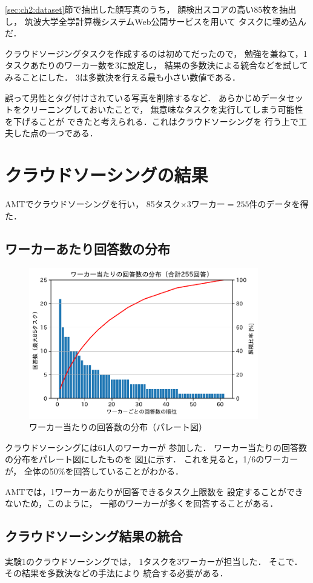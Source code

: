 \ref{sec:ch2:dataset}節で抽出した顔写真のうち，
顔検出スコアの高い85枚を抽出し，
筑波大学全学計算機システムWeb公開サービスを用いて
タスクに埋め込んだ．

クラウドソージングタスクを作成するのは初めてだったので，
勉強を兼ねて，1タスクあたりのワーカー数を3に設定し，
結果の多数決による統合などを試してみることにした．
3は多数決を行える最も小さい数値である．

誤って男性とタグ付けされている写真を削除するなど．
あらかじめデータセットをクリーニングしておいたことで，
無意味なタスクを実行してしまう可能性を下げることが
できたと考えられる．これはクラウドソーシングを
行う上で工夫した点の一つである．

\section{クラウドソーシングの結果}
AMTでクラウドソーシングを行い，
85タスク$\times$3ワーカー$=255$件のデータを得た．

\subsection{ワーカーあたり回答数の分布}
\begin{figure}[tb]
\centering
\includegraphics[width=10cm]{ch2/worker_plot.pdf}
\caption{ワーカー当たりの回答数の分布（パレート図）
\label{fig:ch2:worker}}
\end{figure}
クラウドソーシングには61人のワーカーが
参加した．
ワーカー当たりの回答数の分布をパレート図にしたものを
図\ref{fig:ch2:worker}に示す．
これを見ると，1/6のワーカーが，
全体の50\%を回答していることがわかる．

AMTでは，1ワーカーあたりが回答できるタスク上限数を
設定することができないため，このように，
一部のワーカーが多くを回答することがある．

\subsection{クラウドソーシング結果の統合}
実験1のクラウドソーシングでは，
1タスクを3ワーカーが担当した．
そこで．その結果を多数決などの手法により
統合する必要がある．

